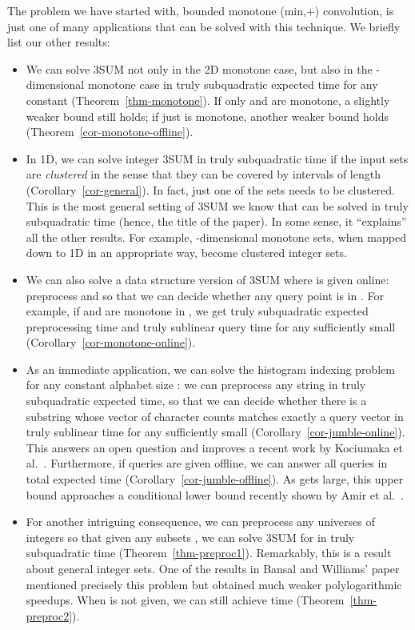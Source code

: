 \documentclass[11pt]{article}
\newcommand{\LONG}[1]{#1}\newcommand{\SHORT}[1]{}
\begin{document}
The problem we have started with, bounded monotone (min,+) convolution, is just one of many applications that can
be solved with this technique.  We briefly list our
other results:
\begin{itemize}
\item
We can solve 3SUM not only in the 2D monotone case, but
also in the -dimensional monotone case
in truly subquadratic
 expected time
for any constant  (Theorem~\ref{thm-monotone}).
If only  and  are monotone,
a slightly weaker bound  still holds;
if just  is monotone, another
weaker bound  holds (Theorem~\ref{cor-monotone-offline}).
\item
In 1D,
we can solve integer 3SUM in truly subquadratic
 time
if the input sets are {\em clustered} in the sense that
they can be covered by 
intervals of length  (Corollary~\ref{cor-general}).
In fact, just one of the sets  needs to be clustered.
This is the most general setting of 3SUM we know that
can be solved in truly subquadratic time
(hence, the title of the paper).
In some sense, it ``explains'' all the other results.
For example, -dimensional
monotone sets, when mapped down to 1D in an appropriate way, become
clustered integer sets.

\item We can also solve a data structure version of 3SUM where
 is given online:
preprocess  and  so that we can decide whether
any query point  is in .
For example, if  and  are monotone in ,
we get truly subquadratic  expected
preprocessing time and truly sublinear 
query time for any sufficiently small 
(\LONG{Corollary~\ref{cor-monotone-online}}\SHORT{see the full paper}).
\item
As an immediate application,
we can solve the histogram indexing problem for any constant alphabet size : we can preprocess any string  in truly
subquadratic  expected time, so that we can decide
whether there is a substring whose vector of character counts
matches exactly a query vector in truly sublinear
 time for any sufficiently
small  (\LONG{Corollary~\ref{cor-jumble-online}}\SHORT{see the full paper}).
This answers an open question and improves a
recent work by Kociumaka et al.~\cite{KRR13}.
Furthermore, if  queries are given offline, we can answer all queries in total  expected time
(Corollary~\ref{cor-jumble-offline}).
As  gets large,
this upper bound approaches a conditional lower bound recently
shown by Amir et al.~\cite{ACLL14}.
\item
For another intriguing consequence, we can preprocess
any universes  of  integers so that given any subsets
, we can solve 3SUM for  in truly subquadratic
 time (\LONG{Theorem~\ref{thm-preproc1}}\SHORT{see the full paper}).  Remarkably, this is a result about
general integer sets.  One of the results in
Bansal and Williams' paper~\cite{BW12} mentioned precisely
this problem but obtained much weaker polylogarithmic speedups.
When  is not given, we can still achieve  time
(\LONG{Theorem~\ref{thm-preproc2}}\SHORT{see the full paper}).
\end{itemize}
\end{document}
